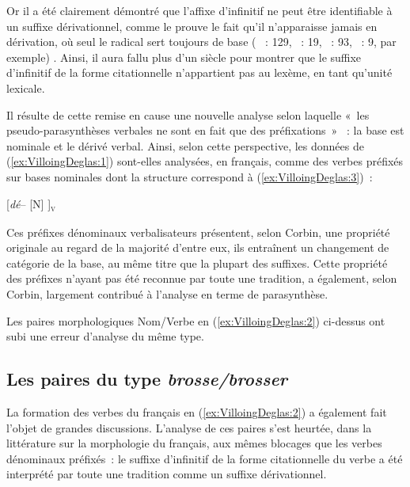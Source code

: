\documentclass[output=paper]{langsci/langscibook}
\begin{document}
Or il a été clairement démontré que l'affixe d'infinitif ne peut être
identifiable à un suffixe dérivationnel, comme le prouve le fait qu'il
n'apparaisse jamais en dérivation, où seul le radical sert toujours de
base %
(%
\citealt{Corbin87}%
%
~: 129, %
\citealt{Lyons77}%
%
~: 19, %
\citealt{Fradin2003}%
%
~: 93, 
\citealt{Fradin2009}%
%
~: 9, par exemple)%
%
. Ainsi, il aura fallu plus d'un
siècle pour montrer que le suffixe d'infinitif de la forme citationnelle
n'appartient pas au lexème, en tant qu'unité lexicale.

Il résulte de cette remise en cause une nouvelle analyse selon laquelle
«~les pseudo-parasynthèses verbales ne sont en fait que des
préfixations~» %
\citep[129]{Corbin87}%
%
~: la base est nominale et le dérivé
verbal. Ainsi, selon cette perspective, les données de (\ref{ex:VilloingDeglas:1}) sont-elles
analysées, en français, comme des verbes préfixés sur bases nominales
dont la structure correspond à (\ref{ex:VilloingDeglas:3})~:

\ea\label{ex:VilloingDeglas:3}{[\emph{dé}-- {[}N{]} {]}}\textsubscript{\textsc{v}}
\z

Ces préfixes dénominaux verbalisateurs présentent, selon Corbin, une
propriété originale au regard de la majorité d'entre eux, ils entraînent
un changement de catégorie de la base, au même titre que la plupart des
suffixes. Cette propriété des préfixes n'ayant pas été reconnue par
toute une tradition, a également, selon Corbin, largement contribué à
l'analyse en terme de parasynthèse.

Les paires morphologiques Nom/Verbe en (\ref{ex:VilloingDeglas:2}) ci-dessus ont subi une erreur d'analyse du même type.

\subsection{\texorpdfstring{Les paires du type
\emph{brosse/brosser}}{Les paires du type brosse/brosser}}\label{les-paires-du-type-brossebrosser}

La formation des verbes du français en (\ref{ex:VilloingDeglas:2}) a également fait l'objet de
grandes discussions. L'analyse de ces paires s'est heurtée, dans la
littérature sur la morphologie du français, aux mêmes blocages que les
verbes dénominaux préfixés~: le suffixe d'infinitif de la forme
citationnelle du verbe a été interprété par toute une tradition comme un
suffixe dérivationnel.
\end{document}
